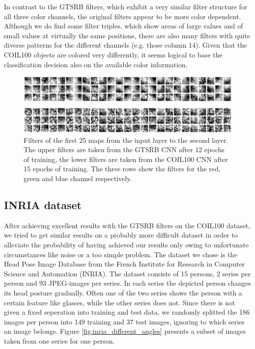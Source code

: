 \documentclass[11pt, a4paper]{article}
\begin{document}
In contrast to the GTSRB filters, which exhibit a very similar filter structure for all three color channels, the original filters appear to be more color dependent. Although we do find some filter triples, which show areas of large values and of small values at virtually the same positions, there are also many filters with quite diverse patterns for the different channels (e.g. those column 14). Given that the COIL100 objects are colored very differently, it seems logical to base the classification decision also on the available color information.

\begin{figure}[h!]
	\centering
	\includegraphics[width=1\textwidth]{gtsrb_vs_coil_filters.png}
	\caption{Filters of the first 25 maps from the input layer to the second layer. The upper filters are taken from the GTSRB CNN after 12 epochs of training, the lower filters are taken from the COIL100 CNN after 15 epochs of training. The three rows show the filters for the red, green and blue channel respectively.}
	\label{fig:gtsrb_vs_coil_filters}
\end{figure}


\subsection{INRIA dataset}
\label{subsec:inria}

After achieving excellent results with the GTSRB filters on the COIL100 dataset, we tried to get similar results on a probably more difficult dataset in order to alleviate the probability of having achieved our results only owing to unfortunate circumstances like noise or a too simple problem. The dataset we chose is the Head Pose Image Database \cite{estimating-face-orientation-inria} from the French Institute for Research in Computer Science and Automation (INRIA). The dataset consists of 15 persons, 2 series per person and 93 JPEG-images per series. In each series the depicted person changes its head posture gradually. Often one of the two series shows the person with a certain feature like glasses, while the other series does not. Since there is not given a fixed seperation into training and test data, we randomly splitted the 186 images per person into 149 training and 37 test images, ignoring to which series an image belongs. Figure \ref{fig:inria_different_angles} presents a subset of images taken from one series for one person.
\end{document}
